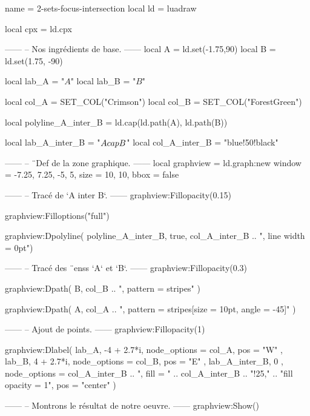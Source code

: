 \documentclass[border = 3pt]{standalone}
\begin{document}
\begin{luadraw*}{name = 2-sets-focus-intersection} 
local ld = luadraw

local cpx = ld.cpx

------
-- Nos ingrédients de base.
------
local A = ld.set(-1.75,90)
local B = ld.set(1.75, -90)

local lab_A = "$A$"
local lab_B = "$B$"

local col_A = SET_COL("Crimson")
local col_B = SET_COL("ForestGreen")

local polyline_A_inter_B = ld.cap(ld.path(A), ld.path(B))

local lab_A_inter_B = "$A \\cap B$"
local col_A_inter_B = "blue!50!black"

------
-- ¨Def de la zone graphique.
------
local graphview = ld.graph:new{
  window = {-7.25, 7.25, -5, 5},
  size   = {10, 10},
  bbox   = false
}

------
-- Tracé de `A inter B`.
------
graphview:Fillopacity(0.15)

graphview:Filloptions("full")

graphview:Dpolyline(
  polyline_A_inter_B,
  true,
  col_A_inter_B .. ", line width = 0pt")

------
-- Tracé des ¨enss `A` et `B`.
------
graphview:Fillopacity(0.3)

graphview:Dpath(
  B,
  col_B .. ", pattern = stripes"
)

graphview:Dpath(
  A,
  col_A .. ", pattern = {stripes[size = 10pt, angle = -45]}"
)


------
-- Ajout de points.
------
graphview:Fillopacity(1)

graphview:Dlabel(
  lab_A, -4 + 2.7*i,
  {
    node_options = col_A, 
    pos          = "W"
  },
  lab_B, 4 + 2.7*i,
  {
    node_options = col_B,
    pos          = "E"
  },
  lab_A_inter_B, 0 ,
  {
    node_options = col_A_inter_B
                .. ", fill = " .. col_A_inter_B .. "!25,"
                .. "fill opacity = 1",
    pos = "center"
  }
)

------
-- Montrons le résultat de notre oeuvre.
------
graphview:Show()
\end{luadraw*}
\end{document}
